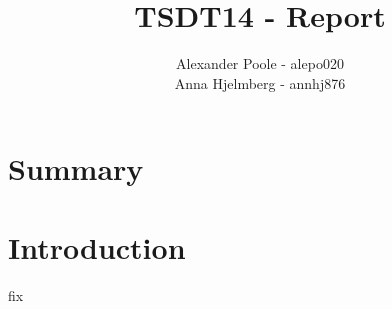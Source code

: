 \documentclass[a4paper,12pt]{article}
\title{TSDT14 - Report}
\author{Alexander Poole - alepo020 \\ Anna Hjelmberg - annhj876}
\begin{document}
\maketitle
	\thispagestyle{empty}
\newpage

\section{Summary}

\newpage
\tableofcontents
\newpage

\section{Introduction}








fix
\end{document}
